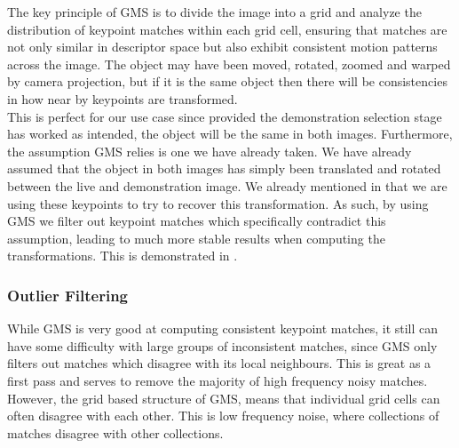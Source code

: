 The key principle of GMS is to divide the image into a grid and analyze the distribution of keypoint matches within each grid cell, ensuring that matches are not only similar in descriptor space but also exhibit consistent motion patterns across the image. The object may have been moved, rotated, zoomed and warped by camera projection, but if it is the same object then there will be consistencies in how near by keypoints are transformed.\\

This is perfect for our use case since provided the demonstration selection stage has worked as intended, the object will be the same in both images. Furthermore, the assumption GMS relies is one we have already taken. We have already assumed that the object in both images has simply been translated and rotated between the live and demonstration image. We already mentioned in  that we are using these keypoints to try to recover this transformation. As such, by using GMS we filter out keypoint matches which specifically contradict this assumption, leading to much more stable results when computing the transformations. This is demonstrated in .

\subsubsection{Outlier Filtering}
While GMS is very good at computing consistent keypoint matches, it still can have some difficulty with large groups of inconsistent matches, since GMS only filters out matches which disagree with its local neighbours. This is great as a first pass and serves to remove the majority of high frequency noisy matches. However, the grid based structure of GMS, means that individual grid cells can often disagree with each other. This is low frequency noise, where collections of matches disagree with other collections.\\

